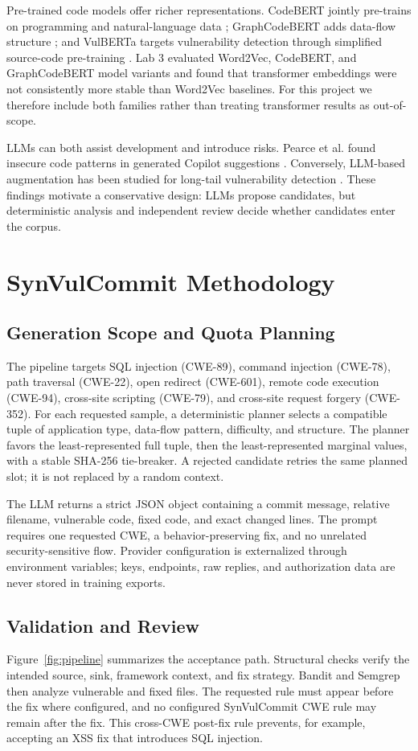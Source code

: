 Pre-trained code models offer richer representations. CodeBERT jointly pre-trains on programming and natural-language data \cite{codebert}; GraphCodeBERT adds data-flow structure \cite{graphcodebert}; and VulBERTa targets vulnerability detection through simplified source-code pre-training \cite{vulberta}. Lab 3 evaluated Word2Vec, CodeBERT, and GraphCodeBERT model variants and found that transformer embeddings were not consistently more stable than Word2Vec baselines. For this project we therefore include both families rather than treating transformer results as out-of-scope.

LLMs can both assist development and introduce risks. Pearce et al. found insecure code patterns in generated Copilot suggestions \cite{pearce2022}. Conversely, LLM-based augmentation has been studied for long-tail vulnerability detection \cite{deng2024}. These findings motivate a conservative design: LLMs propose candidates, but deterministic analysis and independent review decide whether candidates enter the corpus.

\section{SynVulCommit Methodology}
\subsection{Generation Scope and Quota Planning}
The pipeline targets SQL injection (CWE-89), command injection (CWE-78), path traversal (CWE-22), open redirect (CWE-601), remote code execution (CWE-94), cross-site scripting (CWE-79), and cross-site request forgery (CWE-352). For each requested sample, a deterministic planner selects a compatible tuple of application type, data-flow pattern, difficulty, and structure. The planner favors the least-represented full tuple, then the least-represented marginal values, with a stable SHA-256 tie-breaker. A rejected candidate retries the same planned slot; it is not replaced by a random context.

The LLM returns a strict JSON object containing a commit message, relative filename, vulnerable code, fixed code, and exact changed lines. The prompt requires one requested CWE, a behavior-preserving fix, and no unrelated security-sensitive flow. Provider configuration is externalized through environment variables; keys, endpoints, raw replies, and authorization data are never stored in training exports.

\subsection{Validation and Review}
Figure~\ref{fig:pipeline} summarizes the acceptance path. Structural checks verify the intended source, sink, framework context, and fix strategy. Bandit and Semgrep then analyze vulnerable and fixed files. The requested rule must appear before the fix where configured, and no configured SynVulCommit CWE rule may remain after the fix. This cross-CWE post-fix rule prevents, for example, accepting an XSS fix that introduces SQL injection.

